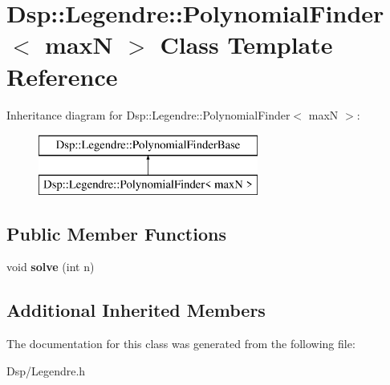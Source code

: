 \hypertarget{classDsp_1_1Legendre_1_1PolynomialFinder}{\section{Dsp\-:\-:Legendre\-:\-:Polynomial\-Finder$<$ max\-N $>$ Class Template Reference}
\label{classDsp_1_1Legendre_1_1PolynomialFinder}
}
Inheritance diagram for Dsp\-:\-:Legendre\-:\-:Polynomial\-Finder$<$ max\-N $>$\-:\begin{figure}[H]
\begin{center}
\leavevmode
\includegraphics[height=2.000000cm]{classDsp_1_1Legendre_1_1PolynomialFinder}
\end{center}
\end{figure}
\subsection*{Public Member Functions}
\begin{DoxyCompactItemize}
\item 
\hypertarget{classDsp_1_1Legendre_1_1PolynomialFinder_abe6223ece65839d8d700bc65c7c6d977}{void {\bfseries solve} (int n)}\label{classDsp_1_1Legendre_1_1PolynomialFinder_abe6223ece65839d8d700bc65c7c6d977}

\end{DoxyCompactItemize}
\subsection*{Additional Inherited Members}


The documentation for this class was generated from the following file\-:\begin{DoxyCompactItemize}
\item 
Dsp/Legendre.\-h\end{DoxyCompactItemize}
